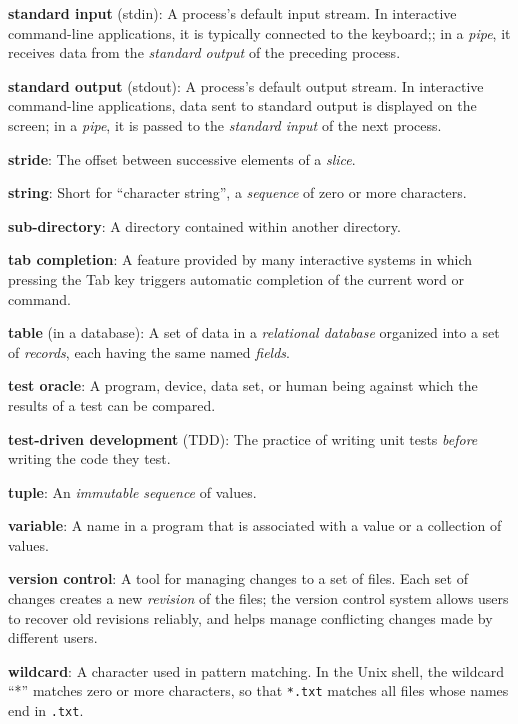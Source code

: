 \documentclass[]{book}
\newcommand{\gdef}[2]{\emph{#2}}
\begin{document}
\textbf{standard input} (stdin): A process's default input stream. In
interactive command-line applications, it is typically connected to the
keyboard;; in a \gdef{g:pipe}{pipe}, it receives data from the
\gdef{g:standard-output}{standard output} of the preceding process.

\textbf{standard output} (stdout): A process's default output stream. In
interactive command-line applications, data sent to standard output is
displayed on the screen; in a \gdef{g:pipe}{pipe}, it is passed to
the \gdef{g:standard-input}{standard input} of the next process.

\textbf{stride}: The offset between successive elements of a
\gdef{g:slice}{slice}.

\textbf{string}: Short for ``character string'', a
\gdef{g:sequence}{sequence} of zero or more characters.

\textbf{sub-directory}: A directory contained within another directory.

\textbf{tab completion}: A feature provided by many interactive systems
in which pressing the Tab key triggers automatic completion of the
current word or command.

\textbf{table} (in a database): A set of data in a
\gdef{g:relational-database}{relational database} organized into a
set of \gdef{g:record-database}{records}, each having the same named
\gdef{g:field-database}{fields}.

\textbf{test oracle}: A program, device, data set, or human being
against which the results of a test can be compared.

\textbf{test-driven development} (TDD): The practice of writing unit
tests \emph{before} writing the code they test.

\textbf{tuple}: An \gdef{g:immutable}{immutable}
\gdef{g:sequence}{sequence} of values.

\textbf{variable}: A name in a program that is associated with a value
or a collection of values.

\textbf{version control}: A tool for managing changes to a set of files.
Each set of changes creates a new \gdef{g:revision}{revision} of the
files; the version control system allows users to recover old revisions
reliably, and helps manage conflicting changes made by different users.

\textbf{wildcard}: A character used in pattern matching. In the Unix
shell, the wildcard ``*'' matches zero or more characters, so that
\texttt{*.txt} matches all files whose names end in \texttt{.txt}.
\end{document}
